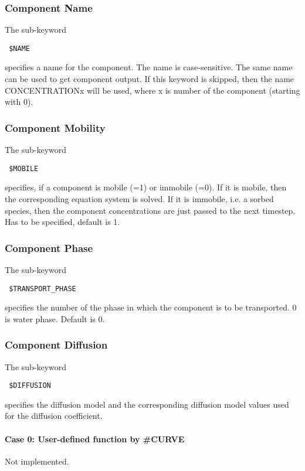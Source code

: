 \subsubsection{Component Name}
The sub-keyword
\begin{verbatim}
 $NAME
\end{verbatim}
specifies a name for the component. The name is case-sensitive. The same name can be used to get component output.
If this keyword is skipped, then the name CONCENTRATIONx will be used, where x is number of the component (starting with 0).

\subsubsection{Component Mobility}
The sub-keyword
\begin{verbatim}
 $MOBILE
\end{verbatim}
specifies, if a component is mobile (=1) or immobile (=0). If it is mobile, then the corresponding equation system is solved. If it is immobile, i.e. a sorbed species, then the component concentrations are just passed to the next timestep. Has to be specified, default is 1.

\subsubsection{Component Phase}
The sub-keyword
\begin{verbatim}
 $TRANSPORT_PHASE
\end{verbatim}
specifies the number of the phase in which the component is to be transported. 0 is water phase. Default is 0.

\subsubsection{Component Diffusion}
The sub-keyword
\begin{verbatim}
 $DIFFUSION
\end{verbatim}
specifies the diffusion model and the corresponding diffusion model values used for the diffusion coefficient.

\paragraph*{Case 0: User-defined function by \#CURVE}
Not implemented.

